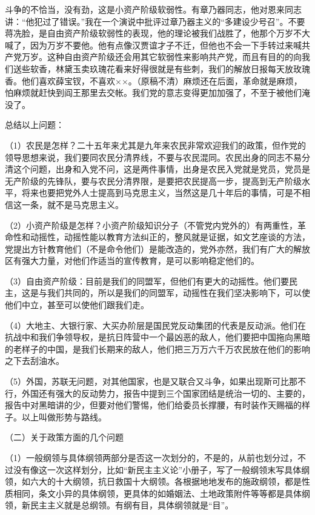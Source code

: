 斗争的不恰当，没有劲，这是小资产阶级软弱性。有章乃器同志，他对恩来同志讲：“他犯过了错误。”我在一个演说中批评过章乃器主义的“多建设少号召”。不要蒋冼脸，是自由资产阶级软弱性的表现，他的理论被我们战胜了，他那个万岁不大喊了，因为万岁不要他。他有点像汉贾谊才子不迁，但他也不会一下手转过来喊共产党万岁。这种自由资产阶级还会用其它软弱性来影响共产党，而且有目的的向我们送些软香，林黛玉卖玖瑰花看来好得很就是有些刺，我们的解放日报每天放玫瑰香。他们喜欢薛宝钗，不喜欢××。（原稿不清）麻烦还在后面，革命就是麻烦，怕麻烦就赶快到阎王那里去交帐。我们党的意志变得更加加强了，不至于被他们淹没了。

总结以上问题：

（1）农民是怎样？二十五年来尤其是九年来农民非常欢迎我们的政策，但作党的领导思想来说，我们要同农民分清界线，不要与农民混同。农民出身的同志不易分清这个问题，出身和入党不问，这是两件事情，出身是农民入党就是党员，党员是无产阶级的先锋队，要与农民分清界限，是要把农民提高一步，提高到无产阶级水平，将来也要把党外人士提高到马克思主义，当然这是几十年后的事情，可是不相信这一条，就不是马克思主义。

（2）小资产阶级是怎样？小资产阶级知识分子（不管党内党外的）有两重性，革命性和动摇性，动摇性能以教育方法纠正的，整风就是证据，如文艺座谈的方法，党提出方针教育他们（不是命令他们）是能改造的，党外亦然，我们有广大的解放区有强大力量，对他们作适当的宣传教育，是可以影响稳定他们的。

（3）自由资产阶级：目前是我们的同盟军，但他们有更大的动摇性。他们要民主，这是与我们共同的，所以是我们的同盟军，动摇性在我们坚决影响下，可以使他们中立，甚至可以使他们跟我们走。

（4）大地主、大银行家、大买办阶层是国民党反动集团的代表是反动派。他们在抗战中和我们争领导权，是抗日阵营中一个最凶恶的敌人，他们要把中国拖向黑暗的老样子的中国，是我们长期来的敌人，他们把三万万六千万农民放在他们的影响之下去刮油水。

（5）外国，苏联无问题，对其他国家，也是又联合又斗争，如果出现斯可比那不行，外国还有强大的反动势力，报告中提到三个国家团结是统治一切的、主要的，报告中对黑暗讲的少，但要对他们警惕，他们给委员长撑腰，有时装作天赐福的样子。以上叫做形势与路线。

（二）关于政策方面的几个问题

（1）一般纲领与具体纲领两部分是否这一次划分的，不是的，从前也划分过，不过没有像这一次这样划分，比如“新民主主义论”小册子，写了一般纲领末写具体纲领，如六大的十大纲领，抗日救国十大纲领。各根据地地发布的施政纲领，都是性质相同，条文小异的具体纲领，更具体的如婚姻法、土地政策附件等等都是具体纲领，新民主主义就是总纲领。有纲有目，具体纲领就是“目”。

